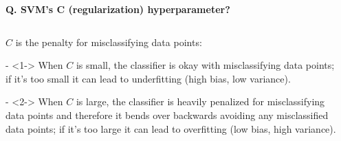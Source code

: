 \begin{frame}[fragile]{\textbf{Q. SVM's C (regularization) hyperparameter?}}
  \begin{columns}[T] %
    \begin{column}{.7\textwidth}
      \begin{wideitemize}
      \item $C$ is the penalty for misclassifying data points:
        \begin{wideitemize}
        \item[-]<1-> When $C$ is small, the classifier is okay with misclassifying data
          points; {\footnotesize if it's too small it can lead to underfitting
            (high bias, low variance)}.
        \item[-]<2-> When $C$ is large, the classifier is heavily penalized for misclassifying
          data points and therefore it bends over backwards avoiding any misclassified
          data points; {\footnotesize if it's too large it can lead to overfitting (low bias, high variance)}.
        \end{wideitemize}
      \end{wideitemize}
    \end{column}%
    \hfill%
    \begin{column}{.28\textwidth}
\end{column}
\end{columns}
\end{frame}
